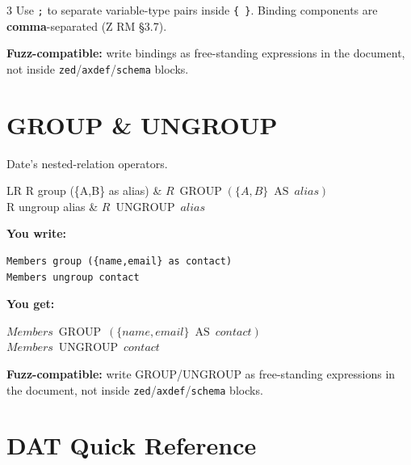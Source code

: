 \documentclass[10pt,landscape,a4paper]{article}
\newenvironment{exwrite}%
  {\par\noindent\scriptsize\textbf{You write:}\par\vspace{0pt}\scriptsize}%
  {\vspace{1pt}}
\newenvironment{exget}%
  {\par\noindent\scriptsize\textbf{You get:}\par\vspace{0pt}\small}%
  {\par\vspace{3pt}}
\begin{document}
\begin{multicols}{3}
{\scriptsize Use \texttt{;} to separate variable-type pairs inside \texttt{\{ \}}. Binding components are \textbf{comma}-separated (Z RM §3.7).}

\smallskip
{\scriptsize\textbf{Fuzz-compatible:} write bindings as free-standing expressions in the document, not inside \texttt{zed}/\texttt{axdef}/\texttt{schema} blocks.}

\section{GROUP \& UNGROUP}

{\scriptsize Date's nested-relation operators.}

\begin{tabularx}{\columnwidth}{LR}
R group (\{A,B\} as alias) & $R\ \mathop{\mathrm{GROUP}} (\{A,B\}\ \mathop{\mathrm{AS}}\ alias)$ \\
R ungroup alias    & $R\ \mathop{\mathrm{UNGROUP}}\ alias$ \\
\end{tabularx}

\begin{exwrite}
\begin{verbatim}
Members group ({name,email} as contact)
Members ungroup contact
\end{verbatim}
\end{exwrite}
\begin{exget}
\begin{center}
$Members\ \mathop{\mathrm{GROUP}}\ (\{name,email\}\ \mathop{\mathrm{AS}}\ contact)$\\[3pt]
$Members\ \mathop{\mathrm{UNGROUP}}\ contact$
\end{center}
\end{exget}

{\scriptsize\textbf{Fuzz-compatible:} write GROUP/UNGROUP as free-standing expressions in the document, not inside \texttt{zed}/\texttt{axdef}/\texttt{schema} blocks.}

\section{DAT Quick Reference}


\end{multicols}
\end{document}
